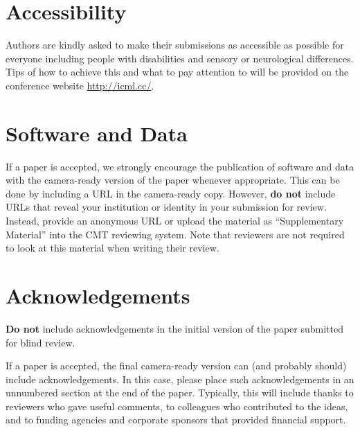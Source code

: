 \documentclass[nohyperref]{article}
\theoremstyle{plain}
\theoremstyle{definition}
\theoremstyle{remark}
\begin{document}
\section*{Accessibility}
Authors are kindly asked to make their submissions as accessible as possible for everyone including people with disabilities and sensory or neurological differences.
Tips of how to achieve this and what to pay attention to will be provided on the conference website \url{http://icml.cc/}.

\section*{Software and Data}

If a paper is accepted, we strongly encourage the publication of software and data with the
camera-ready version of the paper whenever appropriate. This can be
done by including a URL in the camera-ready copy. However, \textbf{do not}
include URLs that reveal your institution or identity in your
submission for review. Instead, provide an anonymous URL or upload
the material as ``Supplementary Material'' into the CMT reviewing
system. Note that reviewers are not required to look at this material
when writing their review.

\section*{Acknowledgements}

\textbf{Do not} include acknowledgements in the initial version of
the paper submitted for blind review.

If a paper is accepted, the final camera-ready version can (and
probably should) include acknowledgements. In this case, please
place such acknowledgements in an unnumbered section at the
end of the paper. Typically, this will include thanks to reviewers
who gave useful comments, to colleagues who contributed to the ideas,
and to funding agencies and corporate sponsors that provided financial
support.


\nocite{langley00}





\newpage
\appendix
\onecolumn
\end{document}
